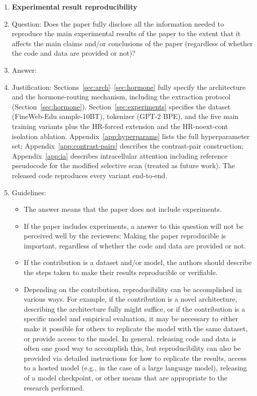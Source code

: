 \begin{enumerate}
    \item {\bf Experimental result reproducibility}
    \item[] Question: Does the paper fully disclose all the information needed to reproduce the main experimental results of the paper to the extent that it affects the main claims and/or conclusions of the paper (regardless of whether the code and data are provided or not)?
    \item[] Answer: \answerYes{}
    \item[] Justification: Sections~\ref{sec:arch}--\ref{sec:hormone} fully specify the architecture and the hormone-routing mechanism, including the extraction protocol (Section~\ref{sec:hormone}). Section~\ref{sec:experiments} specifies the dataset (FineWeb-Edu sample-10BT), tokenizer (GPT-2 BPE), and the five main training variants plus the HR-forced extension and the HR-noext-cont isolation ablation. Appendix~\ref{app:hyperparams} lists the full hyperparameter set; Appendix~\ref{app:contrast-pairs} describes the contrast-pair construction; Appendix~\ref{app:ia} describes intracellular attention including reference pseudocode for the modified selective scan (treated as future work). The released code reproduces every variant end-to-end.
    \item[] Guidelines:
    \begin{itemize}
        \item The answer \answerNA{} means that the paper does not include experiments.
        \item If the paper includes experiments, a \answerNo{} answer to this question will not be perceived well by the reviewers: Making the paper reproducible is important, regardless of whether the code and data are provided or not.
        \item If the contribution is a dataset and\slash or model, the authors should describe the steps taken to make their results reproducible or verifiable. 
        \item Depending on the contribution, reproducibility can be accomplished in various ways. For example, if the contribution is a novel architecture, describing the architecture fully might suffice, or if the contribution is a specific model and empirical evaluation, it may be necessary to either make it possible for others to replicate the model with the same dataset, or provide access to the model. In general. releasing code and data is often one good way to accomplish this, but reproducibility can also be provided via detailed instructions for how to replicate the results, access to a hosted model (e.g., in the case of a large language model), releasing of a model checkpoint, or other means that are appropriate to the research performed.

\end{itemize}
\end{enumerate}
